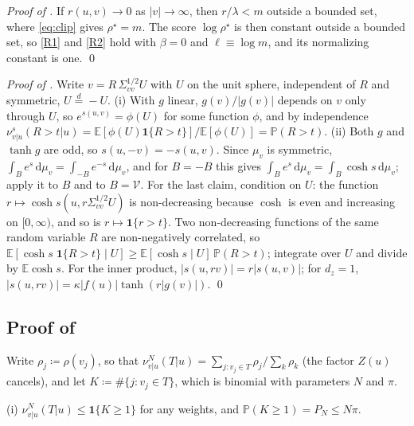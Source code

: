 \documentclass[11pt]{article}
\theoremstyle{plain}
\theoremstyle{definition}
\theoremstyle{remark}
\newcommand{\E}{\mathbb{E}}
\newcommand{\VV}{\mathcal{V}}
\newcommand{\Dd}{\mathrm{d}}
\newcommand{\define}{\coloneqq}
\newcommand{\abs}[1]{\left\lvert #1 \right\rvert}
\newcommand{\indicator}{\mathbf{1}}
\begin{document}
\smallskip
\noindent\emph{Proof of .}
If $r(u,v)\to0$ as $\abs{v}\to\infty$, then $r/\lambda<m$ outside a bounded
set, where \eqref{eq:clip} gives $\rho^{\star}=m$. The score
$\log\rho^{\star}$ is then constant outside a bounded set, so \ref{R1} and
\ref{R2} hold with $\beta=0$ and $\ell\equiv\log m$, and its normalizing
constant is one.
\qed

\smallskip
\noindent\emph{Proof of .}
\label{app:linearsat}
Write $v=R\,\Sigma_{vv}^{1/2}U$ with $U$ on the unit sphere, independent of
$R$ and symmetric, $U\overset{d}{=}-U$. (i) With $g$ linear,
$g(v)/\abs{g(v)}$ depends on $v$ only through $U$, so $e^{s(u,v)}=\phi(U)$
for some function $\phi$, and by independence
$\nu^{s}_{v\vert u}(R>t\vert u)=\E[\phi(U)\indicator\{R>t\}]/\E[\phi(U)]=\mathbb{P}(R>t)$.
(ii) Both $g$ and $\tanh g$ are odd, so $s(u,-v)=-s(u,v)$. Since $\mu_v$ is
symmetric, $\int_Be^{s}\,\Dd\mu_v=\int_{-B}e^{-s}\,\Dd\mu_v$, and for $B=-B$
this gives $\int_Be^{s}\,\Dd\mu_v=\int_B\cosh s\,\Dd\mu_v$; apply it to $B$
and to $B=\VV$. For the last claim, condition on $U$: the function
$r\mapsto\cosh s(u,r\Sigma_{vv}^{1/2}U)$ is non-decreasing because $\cosh$ is
even and increasing on $[0,\infty)$, and so is $r\mapsto\indicator\{r>t\}$.
Two non-decreasing functions of the same random variable $R$ are
non-negatively correlated, so
$\E[\cosh s\;\indicator\{R>t\}\mid U]\ge\E[\cosh s\mid U]\,\mathbb{P}(R>t)$;
integrate over $U$ and divide by $\E\cosh s$. For the inner product,
$\abs{s(u,rv)}=r\abs{s(u,v)}$; for $d_z=1$,
$\abs{s(u,rv)}=\kappa\abs{f(u)}\tanh(r\abs{g(v)})$.
\qed

\subsection{Proof of \texorpdfstring{}{Theorem 4.21}}
\label{app:exposure}
Write $\rho_j\define\rho(v_j)$, so that
$\nu^{N}_{v\vert u}(T\vert u)=\sum_{j:v_j\in T}\rho_j\big/\sum_{k}\rho_k$ (the
factor $Z(u)$ cancels), and let $K\define\#\{j:v_j\in T\}$, which is binomial
with parameters $N$ and $\pi$.

(i) $\nu^{N}_{v\vert u}(T\vert u)\le\indicator\{K\ge1\}$ for any weights, and
$\mathbb{P}(K\ge1)=P_N\le N\pi$.
\end{document}
